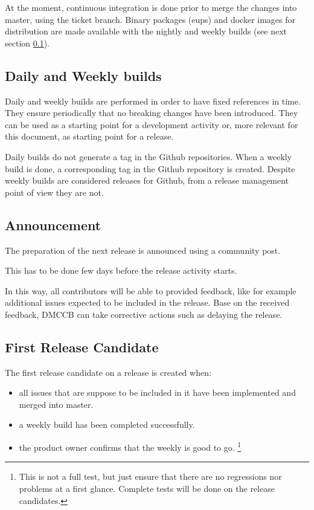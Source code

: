 At the moment, continuous integration is done prior to merge the changes into master, using the ticket branch. Binary packages (eups) and docker images for distribution are made available with the nightly and weekly builds (see next section \ref{sect:weekly}).


\subsection{Daily and Weekly builds} \label{sect:weekly}

Daily and weekly builds are performed in order to have fixed references in time.
They ensure periodically that no breaking changes have been introduced. 
They can be used as a starting point for a development activity or, more relevant for this document, as starting point for a release.

Daily builds do not generate a tag in the Github repositories. 
When a weekly build is done, a corresponding tag in the Github repository is created.
Despite weekly builds are considered releases for Github, from a release management point of view they are not.

 
\subsection{Announcement} \label{sect:anaouncement}

The preparation of the next release is announced using a community post.

This has to be done few days before the release activity starts.

In this way, all contributors will be able to provided feedback, like for example additional issues expected to be included in the release.
Base on the received feedback, DMCCB can take corrective actions such as delaying the release.


\subsection{First Release Candidate} \label{sect:firstrc}

The first release candidate on a release is created when:

\begin{itemize}
\item all issues that are suppose to be included in it have been implemented and merged into master.
\item a weekly build has been completed successfully.
\item the product owner confirms that the weekly is good to go. \footnote{This is not a full test, but just ensure that there are no regressions nor problems at a first glance. Complete tests will be done on the release candidates.}
\end{itemize}

